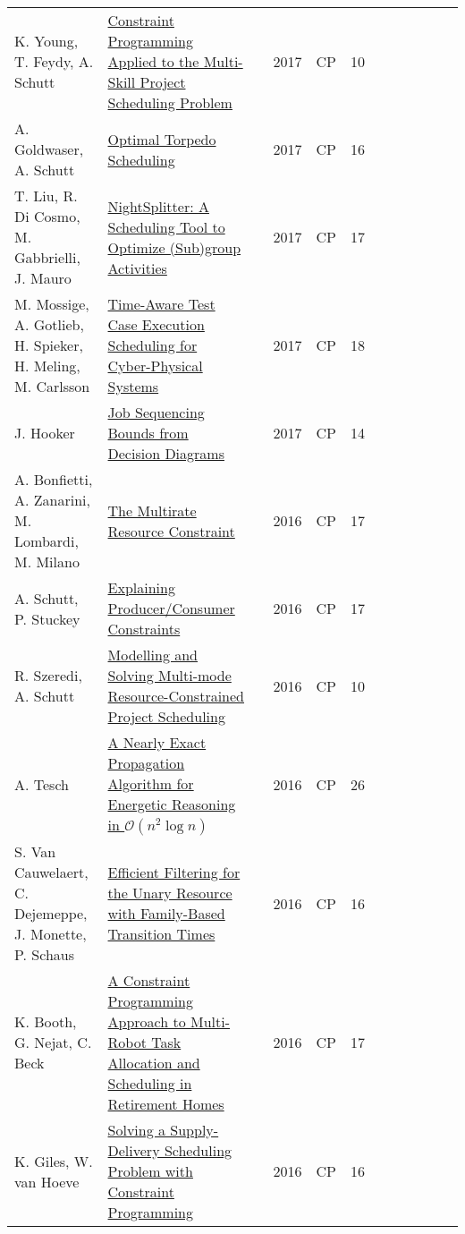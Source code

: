 \documentclass[a4paper]{article}
\begin{document}
{\begin{longtable}{p{3cm}p{6cm}rrcrlcccp{1.5cm}l}
K. Young, T. Feydy, A. Schutt& \href{papers/YoungFS17.pdf}{Constraint Programming Applied to the Multi-Skill Project Scheduling Problem} & \cite{YoungFS17} & 2017 & CP & 10 & & & & & & \\
A. Goldwaser, A. Schutt& \href{papers/GoldwaserS17.pdf}{Optimal Torpedo Scheduling} & \cite{GoldwaserS17} & 2017 & CP & 16 & & & & & & \\
T. Liu, R. Di Cosmo, M. Gabbrielli, J. Mauro& \href{papers/LiuCGM17.pdf}{NightSplitter: {A} Scheduling Tool to Optimize (Sub)group Activities} & \cite{LiuCGM17} & 2017 & CP & 17 & & & & & & \\
M. Mossige, A. Gotlieb, H. Spieker, H. Meling, M. Carlsson& \href{papers/MossigeGSMC17.pdf}{Time-Aware Test Case Execution Scheduling for Cyber-Physical Systems} & \cite{MossigeGSMC17} & 2017 & CP & 18 & & & & & & \\
J. Hooker & \href{papers/Hooker17.pdf}{Job Sequencing Bounds from Decision Diagrams} & \cite{Hooker17} & 2017 & CP & 14 & & & & & & \\
A. Bonfietti, A. Zanarini, M. Lombardi, M. Milano& \href{papers/BonfiettiZLM16.pdf}{The Multirate Resource Constraint} & \cite{BonfiettiZLM16} & 2016 & CP & 17 & & & & & & \\
A. Schutt, P. Stuckey& \href{papers/SchuttS16.pdf}{Explaining Producer/Consumer Constraints} & \cite{SchuttS16} & 2016 & CP & 17 & & & & & & \\
R. Szeredi, A. Schutt& \href{papers/SzerediS16.pdf}{Modelling and Solving Multi-mode Resource-Constrained Project Scheduling} & \cite{SzerediS16} & 2016 & CP & 10 & & & & & & \\
A. Tesch & \href{papers/Tesch16.pdf}{A Nearly Exact Propagation Algorithm for Energetic Reasoning in $\mathcal O(n^2 \log n)$} & \cite{Tesch16} & 2016 & CP & 26 & & & & & & \\
S. Van Cauwelaert, C. Dejemeppe, J. Monette, P. Schaus& \href{papers/CauwelaertDMS16.pdf}{Efficient Filtering for the Unary Resource with Family-Based Transition Times} & \cite{CauwelaertDMS16} & 2016 & CP & 16 & & & & & & \\
K. Booth, G. Nejat, C. Beck& \href{papers/BoothNB16.pdf}{A Constraint Programming Approach to Multi-Robot Task Allocation and Scheduling in Retirement Homes} & \cite{BoothNB16} & 2016 & CP & 17 & & & & & & \\
K. Giles, W. van Hoeve & \href{papers/GilesH16.pdf}{Solving a Supply-Delivery Scheduling Problem with Constraint Programming} & \cite{GilesH16} & 2016 & CP & 16 & & & & & & \\

\end{longtable}}
\end{document}
